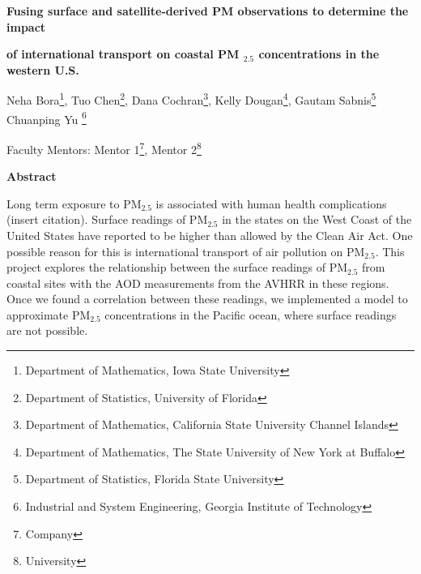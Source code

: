 \documentclass[10pt]{article}
\begin{document}
\centerline{\large \bf Fusing surface and satellite-derived PM observations to determine the impact } 

\centerline{\large \bf of international transport on coastal PM $_{2.5}$ concentrations in the western U.S.}

\vspace{.1truein}

\def\thefootnote{\arabic{footnote}}
\begin{center}
  Neha Bora\footnote{Department of Mathematics, Iowa State University},
  Tuo Chen\footnote{Department of Statistics, University of Florida},
  Dana Cochran\footnote{Department of Mathematics, California State University Channel Islands},
  Kelly Dougan\footnote{Department of Mathematics, The State University of New York at Buffalo},
  Gautam Sabnis\footnote{Department of Statistics, Florida State University}
  Chuanping Yu \footnote{Industrial and System Engineering, Georgia Institute of Technology}
\end{center}


\begin{center}
Faculty Mentors: Mentor 1\footnote{Company},
Mentor 2\footnote{University}
\end{center}


\vspace{.3truein}
\centerline{\bf Abstract}

Long term exposure to PM$_{2.5}$ is associated with human health complications (insert citation). Surface readings of PM$_{2.5}$ in the states on the West Coast of the United States have reported to be higher than allowed by the Clean Air Act. One possible reason for this is international transport of air pollution on PM$_{2.5}$. This project explores the relationship between the surface readings of PM$_{2.5}$ from coastal sites with the AOD measurements from the AVHRR in these regions. Once we found a correlation between these readings, we implemented a model to approximate PM$_{2.5}$ concentrations in the Pacific ocean, where surface readings are not possible.
\end{document}
